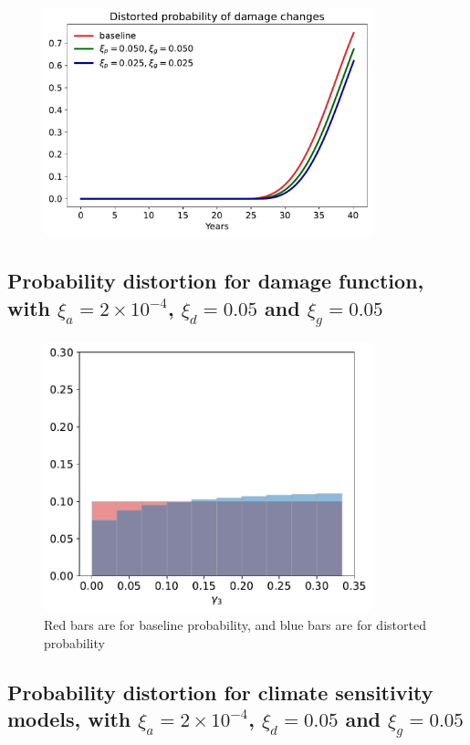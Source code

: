 \documentclass[11pt]{article}
\begin{document}
\begin{figure}[H]
	\centering
	\includegraphics[width=0.85\textwidth]{../figures/20damage/Damage_prob.pdf}
\end{figure}

\subsection{Probability distortion for damage function, with $\xi_a = 2\times 10^{-4}$, $\xi_d = 0.05$ and $\xi_g = 0.05$}

\begin{figure}[H]
	\centering
	\includegraphics[width=0.85\textwidth]{../figures/20damage/Damage_distort.pdf}
	\caption{Red bars are for baseline probability, and blue bars are for distorted probability}
\end{figure}

\subsection{Probability distortion for climate sensitivity models, with $\xi_a = 2\times 10^{-4}$, $\xi_d = 0.05$ and $\xi_g = 0.05$}
\end{document}
